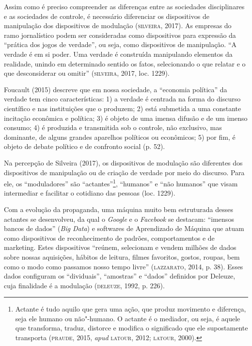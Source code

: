 Assim como é preciso compreender as diferenças entre as sociedades
disciplinares e as sociedades de controle, é necessário diferenciar os
dispositivos de manipulação dos dispositivos de modulação (\textsc{silveira},
2017). As empresas do ramo jornalístico podem ser consideradas como
dispositivos para expressão da ``prática dos jogos de verdade'', ou
seja, como dispositivos de manipulação. ``A verdade é em si poder. Uma
verdade é construída manipulando elementos da realidade, unindo em
determinado sentido os fatos, selecionando o que relatar e o que
desconsiderar ou omitir'' (\textsc{silveira}, 2017, loc. 1229).

Foucault (2015) descreve que em nossa sociedade, a ``economia política''
da verdade tem cinco características: 1) a verdade é centrada na forma
do discurso científico e nas instituições que o produzem; 2) está
submetida a uma constante incitação econômica e política; 3) é objeto de
uma imensa difusão e de um imenso consumo; 4) é produzida e transmitida
sob o controle, não exclusivo, mas dominante, de alguns grandes
aparelhos políticos ou econômicos; 5) por fim, é objeto de debate
político e de confronto social (p. 52).

Na percepção de Silveira (2017), os dispositivos de modulação são
diferentes dos dispositivos de manipulação ou de criação de verdade por
meio do discurso. Para ele, os ``moduladores'' são
``actantes''\footnote{Actante é tudo aquilo que gera uma ação, que
  produz movimento e diferença, seja ele humano ou não"-humano. O actante
  é o mediador, ou seja, é aquele que transforma, traduz, distorce e
  modifica o significado que ele supostamente transporta (\textsc{praude}, 2015,
  \emph{apud} \textsc{latour}, 2012; \textsc{latour}, 2000).}, ``humanos'' e ``não humanos'' que
visam intermediar e facilitar o cotidiano das pessoas (loc. 1229).

Com a evolução da propaganda, uma máquina muito bem estruturada desses
actantes se desenvolveu, da qual o \emph{Google} e o \emph{Facebook} se
destacam: ``imensos bancos de dados'' (\emph{Big Data}) e softwares de
Aprendizado de Máquina que atuam como dispositivos de reconhecimento de
padrões, comportamentos e de marketing. Estes dispositivos ``reúnem,
selecionam e vendem milhões de dados sobre nossas aquisições, hábitos de
leitura, filmes favoritos, gostos, roupas, bem como o modo como passamos
nosso tempo livre'' (\textsc{lazzarato}, 2014, p. 38). Esses dados configuram os
``dividuais'', ``amostras'' e ``dados'' definidos por Deleuze, cuja
finalidade é a modulação (\textsc{deleuze}, 1992, p. 226).

